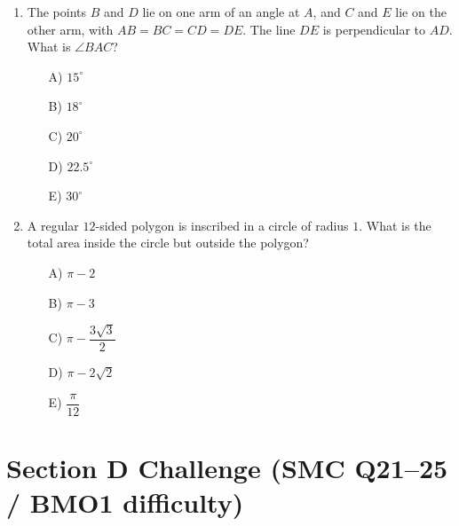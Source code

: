 \documentclass[11pt,a4paper]{article}
\begin{document}
\begin{enumerate}
\item \begin{minipage}[t]{0.60\linewidth}
The points $B$ and $D$ lie on one arm of an angle at $A$, and $C$ and $E$ lie on the other arm, with $AB=BC=CD=DE$. The line $DE$ is perpendicular to $AD$. What is $\angle BAC$?
\begin{itemize}
\item[A)] $15^\circ$
\item[B)] $18^\circ$
\item[C)] $20^\circ$
\item[D)] $22.5^\circ$
\item[E)] $30^\circ$
\end{itemize}
\end{minipage}\hfill
\begin{minipage}[t]{0.36\linewidth}
\vspace{0pt}
\centering
{}
\end{minipage}

\item A regular $12$-sided polygon is inscribed in a circle of radius $1$. What is the total area inside the circle but outside the polygon?
\begin{itemize}
\item[A)] $\pi-2$
\item[B)] $\pi-3$
\item[C)] $\pi-\dfrac{3\sqrt3}{2}$
\item[D)] $\pi-2\sqrt2$
\item[E)] $\dfrac{\pi}{12}$
\end{itemize}

\end{enumerate}

\section*{Section D \quad Challenge \hfill{\normalfont\small(SMC Q21--25 / BMO1 difficulty)}}
\end{document}
